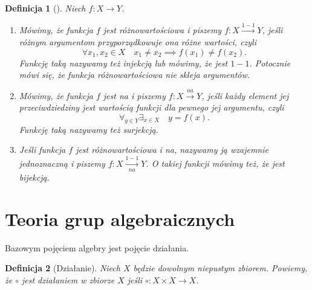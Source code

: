 \documentclass[12pt,a4paper]{report}
\newtheorem{definition}{Definicja}[chapter]
\begin{document}
\begin{definition}[{\citep[Sec 5.2 Def. 5.5]{kraszewski2007wstkep}}]
Niech $f:X \to Y$.
\begin{enumerate}
\item
Mówimy, że funkcja $f$ jest różnowartościowa i piszemy $f:X\xrightarrow{1-1} Y$, jeśli różnym argumentom przyporządkowuje ona różne wartości, czyli
\begin{equation*}
\forall{x_{1},x_{2}}\in X \quad x_{1}\ne x_{2} \implies f(x_{1})\ne f(x_{2}).
\end{equation*}
Funkcję taką nazywamy też injekcją lub mówimy, że jest $1-1$. Potocznie mówi się, że funkcja różnowartościowa nie skleja argumentów.
\item
Mówimy, że funkcja $f$ jest na i piszemy $f:X\xrightarrow{na}Y$, jeśli każdy element jej przeciwdziedziny jest wartością funkcji dla pewnego jej argumentu, czyli
\begin{equation*}
\forall_{y\in Y} \exists_{x\in X} \quad y=f(x).
\end{equation*}
Funkcję taką nazywamy też surjekcją.
\item
Jeśli funkcja $f$ jest różnowartościowa i na, nazywamy ją wzajemnie jednoznaczną i piszemy $f:X\xrightarrow[na]{1-1} Y$. O takiej funkcji mówimy też, że jest bijekcją.
\end{enumerate}
\end{definition}


\section{Teoria grup algebraicznych}

Bazowym pojęciem algebry jest pojęcie działania.

\begin{definition}[Działanie{\citep[Sec 4.1]{jedrzejewski2011algebra}}]
Niech $X$ będzie dowolnym niepustym zbiorem. Powiemy, że $\circ$ jest działaniem w zbiorze $X$ jeśli $\circ: X \times X \to X$.
\end{definition}
\end{document}
